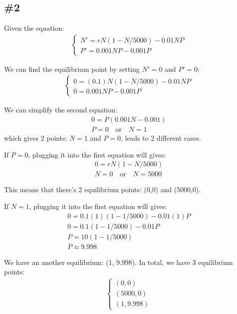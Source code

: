 \documentclass[12pt]{article}
\begin{document}
\subsection*{\#2}
Given the equation:
\begin{align*}
    \begin{cases}
    N' = rN(1 - N / 5000) - 0.01NP \\
    P' = 0.001NP - 0.001P
    \end{cases}
\end{align*}

We can find the equilibrium point by setting $N' = 0$ and $P' = 0$:
\begin{align*}
    \begin{cases}
    0 = (0.1)N(1 - N / 5000) - 0.01NP \\
    0 = 0.001NP - 0.001P
    \end{cases}
\end{align*}

We can simplify the second equation:
\begin{align*}
    0 = P(0.001N - 0.001) \\
    P = 0 \quad \text{or} \quad N = 1
\end{align*}
which gives 2 points: $N = 1$ and $P = 0$, leads to 2 different cases.

If $P = 0$, plugging it into the first equation will gives:
\begin{align*}
    0 = rN(1 - N / 5000) \\
    N = 0 \quad \text{or} \quad N = 5000
\end{align*}

This means that there's 2 equilibrium points: (0,0) and (5000,0).

If $N = 1$, plugging it into the first equation will gives:
\begin{align*}
    0 = 0.1(1)(1 - 1 / 5000) - 0.01(1)P \\
    0 = 0.1(1 - 1 / 5000) - 0.01P \\
    P = 10(1 - 1 / 5000) \\
    P \approx 9.998
\end{align*}

We have an another equilibrium: (1, 9.998).
In total, we have 3 equilibrium points:
\begin{align*}
    \begin{cases}
    (0, 0) \\
    (5000, 0) \\
    (1, 9.998)
    \end{cases}
\end{align*}
\end{document}
